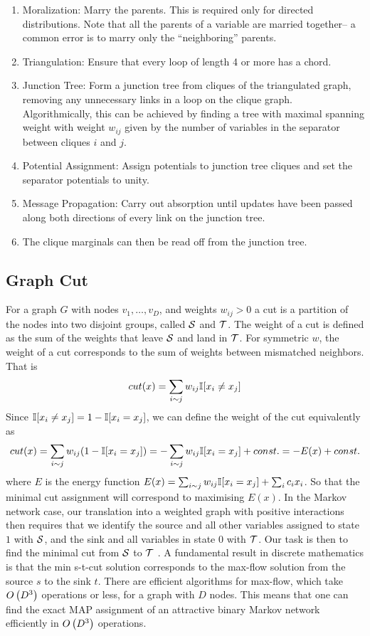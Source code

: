 \begin{enumerate}
	\item Moralization: Marry the parents. This is required only for directed distributions. Note that all the parents of a variable are married together-- a common error is to marry only the ``neighboring'' parents.
	\item Triangulation: Ensure that every loop of length 4 or more has a chord.
	\item Junction Tree:  Form a junction tree from cliques of the triangulated graph, removing any unnecessary links in a loop on the clique graph. Algorithmically, this can be achieved by finding a tree with maximal spanning weight with weight $w_{ij}$ given by the number of variables in the separator between cliques $i$ and $j$.
	\item Potential Assignment: Assign potentials to junction tree cliques and set the separator potentials to unity.
	\item Message Propagation: Carry out absorption until updates have been passed along both directions of every link on the junction tree.
	\item The clique marginals can then be read off from the junction tree.
\end{enumerate}

\subsection{Graph Cut}

For a graph $G$ with nodes $v_1,\dotsc,v_D$, and weights $w_{ij}>0$ a cut is a partition of the nodes into two disjoint groups, called $\mathcal{S}$ and $\mathcal{T}$. The weight of a cut is defined as the sum of the weights that leave $\mathcal{S}$ and land in $\mathcal{T}$. For symmetric $w$, the weight of a cut corresponds to the sum of weights between mismatched neighbors. That is
\begin{align*}
	cut(x)=\sum_{i\sim j}w_{ij}\mathbb{I}[x_i\neq x_j]
\end{align*}
Since $\mathbb{I}[x_i\neq x_j]=1-\mathbb{I}[x_i=x_j]$, we can define the weight of the cut equivalently as
\begin{align*}
	cut(x)=\sum_{i\sim j}w_{ij}(1-\mathbb{I}[x_i=x_j])=-\sum_{i\sim j}w_{ij}\mathbb{I}[x_i=x_j]+const.=-E(x)+const.
\end{align*}
where $E$ is the energy function $E(x)=\sum_{i\sim j}w_{ij}\mathbb{I}[x_i=x_j]+\sum_ic_ix_i$. So that the minimal cut assignment will correspond to maximising $E(x)$. In the Markov network case, our translation into a weighted graph with positive interactions then requires that we identify the source and all other variables assigned to state $1$ with $\mathcal{S}$, and the sink and all variables in state $0$ with $\mathcal{T}$. Our task is then to find the minimal cut from $\mathcal{S}$ to $\mathcal{T}$ . A fundamental result in discrete mathematics is that the min s-t-cut solution corresponds to the max-flow solution from the source $s$ to the sink $t$. There are efficient algorithms for max-flow, which take $O\left(D^3\right)$ operations or less, for a graph with $D$ nodes. This means that one can find the exact MAP assignment of an attractive binary Markov network efficiently in $O\left(D^3\right)$ operations.



